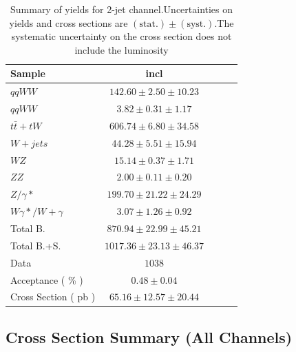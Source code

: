 \begin{table}[!ht]
{\small
\begin{center}
\begin{tabular}{|l|c|c|c|c|}
\hline
Sample	& incl	\\ \hline
$qqWW$	& $142.60 \pm 2.50 \pm 10.23 $	\\ 
$qqWW$	& $3.82 \pm 0.31 \pm 1.17 $	\\ 
$t\bar{t} + tW$	& $606.74 \pm 6.80 \pm 34.58 $	\\ 
$W+jets$	& $44.28 \pm 5.51 \pm 15.94 $	\\ 
$WZ$	& $15.14 \pm 0.37 \pm 1.71 $	\\ 
$ZZ$	& $2.00 \pm 0.11 \pm 0.20 $	\\ 
$Z/\gamma*$	& $199.70 \pm 21.22 \pm 24.29 $	\\ 
$W\gamma*/W+\gamma$	& $3.07 \pm 1.26 \pm 0.92 $	\\ 
\hline \hline 
Total B.	& $870.94 \pm 22.99 \pm 45.21 $	\\ \hline \hline 
Total B.+S.	& $1017.36 \pm 23.13 \pm 46.37 $	\\ \hline \hline
Data	& $1038$ 	\\ \hline \hline
Acceptance ( \% )	& $0.48 \pm 0.04 	$\\ 
Cross Section ( pb )	& $65.16 \pm 12.57 \pm 20.44$ 	\\ \hline
\end{tabular}
\caption{Summary of yields for 2-jet channel.Uncertainties on yields and cross sections are $\mathrm{(stat.)} \pm \mathrm{(syst.)}$.The systematic uncertainty on the cross section does not include the luminosity}
\label{tab:datayields_wwxsec_2j}
\end{center}}
\end{table}
\clearpage
\subsection{Cross Section Summary (All Channels)}

